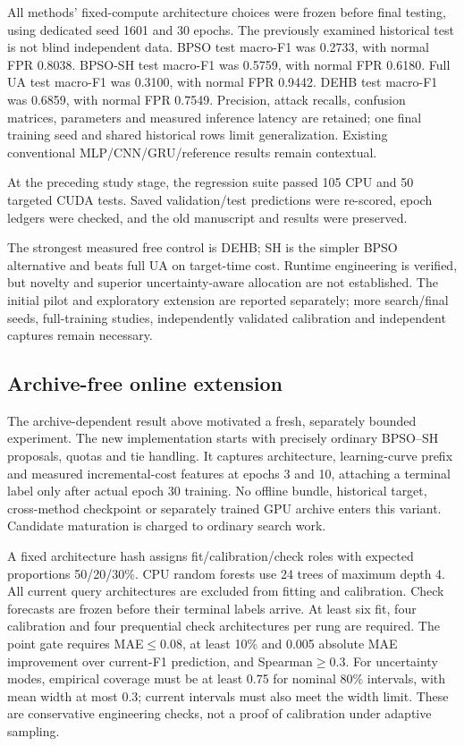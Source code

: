All methods' fixed-compute architecture choices were frozen before final testing, using dedicated seed 1601 and 30 epochs. The previously examined historical test is not blind independent data. BPSO test macro-F1 was 0.2733, with normal FPR 0.8038. BPSO-SH test macro-F1 was 0.5759, with normal FPR 0.6180. Full UA test macro-F1 was 0.3100, with normal FPR 0.9442. DEHB test macro-F1 was 0.6859, with normal FPR 0.7549. Precision, attack recalls, confusion matrices, parameters and measured inference latency are retained; one final training seed and shared historical rows limit generalization. Existing conventional MLP/CNN/GRU/reference results remain contextual.

At the preceding study stage, the regression suite passed 105 CPU and 50 targeted CUDA tests. Saved validation/test predictions were re-scored, epoch ledgers were checked, and the old manuscript and results were preserved.

The strongest measured free control is DEHB; SH is the simpler BPSO alternative and beats full UA on target-time cost. Runtime engineering is verified, but novelty and superior uncertainty-aware allocation are not established. The initial pilot and exploratory extension are reported separately; more search/final seeds, full-training studies, independently validated calibration and independent captures remain necessary.

\subsection{Archive-free online extension}
The archive-dependent result above motivated a fresh, separately bounded experiment. The new implementation starts with precisely ordinary BPSO--SH proposals, quotas and tie handling. It captures architecture, learning-curve prefix and measured incremental-cost features at epochs 3 and 10, attaching a terminal label only after actual epoch 30 training. No offline bundle, historical target, cross-method checkpoint or separately trained GPU archive enters this variant. Candidate maturation is charged to ordinary search work.

A fixed architecture hash assigns fit/calibration/check roles with expected proportions 50/20/30\%. CPU random forests use 24 trees of maximum depth 4. All current query architectures are excluded from fitting and calibration. Check forecasts are frozen before their terminal labels arrive. At least six fit, four calibration and four prequential check architectures per rung are required. The point gate requires MAE$\leq0.08$, at least 10\% and 0.005 absolute MAE improvement over current-F1 prediction, and Spearman$\geq0.3$. For uncertainty modes, empirical coverage must be at least 0.75 for nominal 80\% intervals, with mean width at most 0.3; current intervals must also meet the width limit. These are conservative engineering checks, not a proof of calibration under adaptive sampling.


